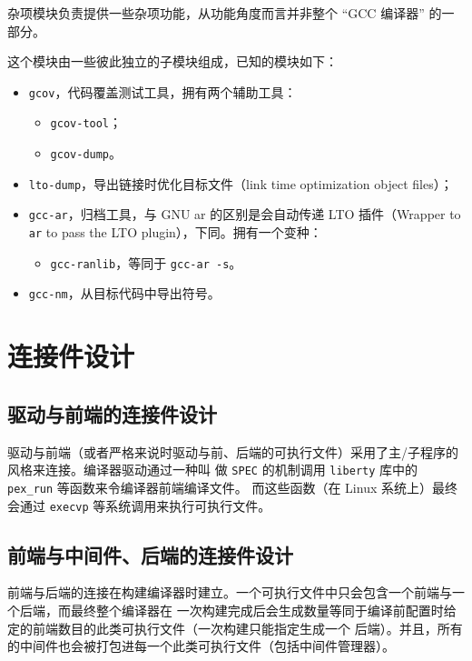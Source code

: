 \documentclass[12pt]{ctexrep}
\begin{document}
    杂项模块负责提供一些杂项功能，从功能角度而言并非整个 ``GCC 编译器'' 的一部分。

    这个模块由一些彼此独立的子模块组成，已知的模块如下：

    \begin{itemize}
        \item \verb|gcov|，代码覆盖测试工具\cite{gcc-gcov}，拥有两个辅助工具：
        \begin{itemize}
            \item \verb|gcov-tool|；
            \item \verb|gcov-dump|。
        \end{itemize}
        \item \verb|lto-dump|，导出链接时优化目标文件（link time optimization object files）\cite{gcc-lto-dump}；
        \item \verb|gcc-ar|，归档工具，与 GNU ar 的区别是会自动传递 LTO 插件（Wrapper to \verb|ar| to pass the LTO plugin），下同。拥有一个变种：
        \begin{itemize}
            \item \verb|gcc-ranlib|，等同于 \verb|gcc-ar -s|。
        \end{itemize}
        \item \verb|gcc-nm|，从目标代码中导出符号。
    \end{itemize}

    \section{连接件设计}

    \subsection{驱动与前端的连接件设计}
    \label{subsec:conn-1}

    驱动与前端（或者严格来说时驱动与前、后端的可执行文件）采用了主/子程序的风格来连接。编译器驱动通过一种叫
    做 \verb|SPEC| 的机制调用 \verb|liberty| 库中的 \verb|pex_run| 等函数来令编译器前端编译文件。
    而这些函数（在 Linux 系统上）最终会通过 \verb|execvp| 等系统调用来执行可执行文件。

    \subsection{前端与中间件、后端的连接件设计}

    前端与后端的连接在构建编译器时建立。一个可执行文件中只会包含一个前端与一个后端，而最终整个编译器在
    一次构建完成后会生成数量等同于编译前配置时给定的前端数目的此类可执行文件（一次构建只能指定生成一个
    后端）。并且，所有的中间件也会被打包进每一个此类可执行文件（包括中间件管理器）。
    
\end{document}
